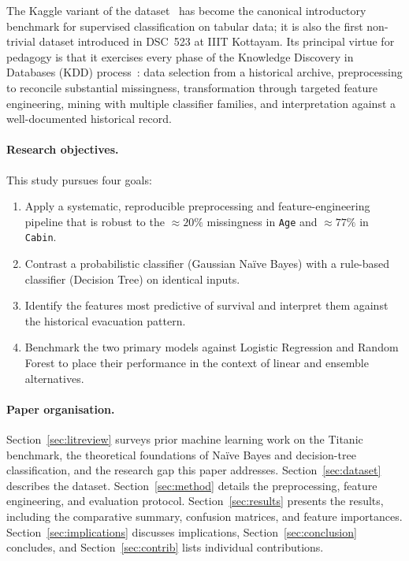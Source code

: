 \documentclass[10pt,a4paper,twocolumn]{article}
\begin{document}
The Kaggle variant of the dataset~\cite{kaggle_titanic} has become the canonical
introductory benchmark for supervised classification on tabular data; it is also the
first non-trivial dataset introduced in DSC~523 at IIIT Kottayam. Its principal virtue
for pedagogy is that it exercises every phase of the Knowledge Discovery in Databases
(KDD) process~\cite{han2011data}: data selection from a historical archive,
preprocessing to reconcile substantial missingness, transformation through targeted
feature engineering, mining with multiple classifier families, and interpretation against
a well-documented historical record.

\paragraph{Research objectives.} This study pursues four goals:
\begin{enumerate}
\itemsep-0.2em
  \item Apply a systematic, reproducible preprocessing and feature-engineering pipeline
  that is robust to the $\approx20\%$ missingness in \texttt{Age} and $\approx77\%$ in
  \texttt{Cabin}.
  \item Contrast a probabilistic classifier (Gaussian Na\"ive Bayes) with a rule-based
  classifier (Decision Tree) on identical inputs.
  \item Identify the features most predictive of survival and interpret them against the
  historical evacuation pattern.
  \item Benchmark the two primary models against Logistic Regression and Random Forest to
  place their performance in the context of linear and ensemble alternatives.
\end{enumerate}

\paragraph{Paper organisation.} Section~\ref{sec:litreview} surveys prior machine
learning work on the Titanic benchmark, the theoretical foundations of Na\"ive Bayes
and decision-tree classification, and the research gap this paper addresses.
Section~\ref{sec:dataset} describes the dataset. Section~\ref{sec:method} details the preprocessing, feature
engineering, and evaluation protocol. Section~\ref{sec:results} presents the results,
including the comparative summary, confusion matrices, and feature importances.
Section~\ref{sec:implications} discusses implications, Section~\ref{sec:conclusion}
concludes, and Section~\ref{sec:contrib} lists individual contributions.
\end{document}
